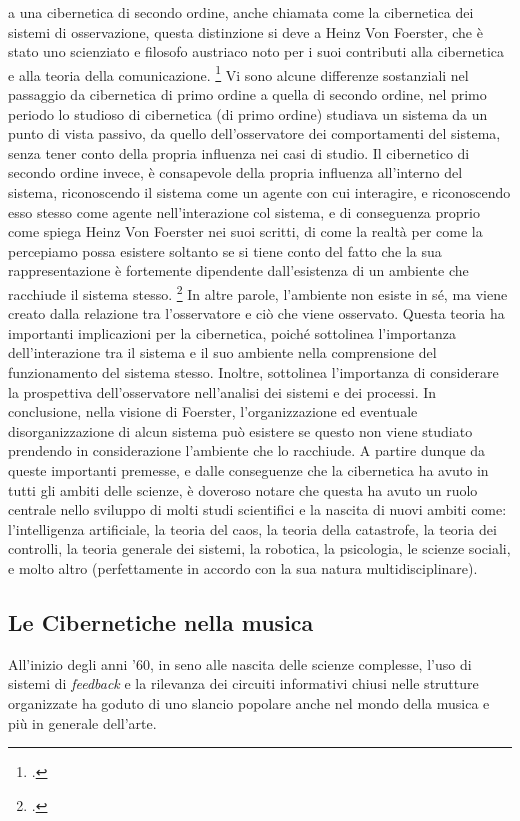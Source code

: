 a una cibernetica di secondo ordine, anche chiamata come la cibernetica dei sistemi di osservazione,
questa distinzione si deve a Heinz Von Foerster, 
che è stato uno scienziato e filosofo austriaco noto per i suoi contributi 
alla cibernetica e alla teoria della comunicazione. \footcite{scottsecondordercyb}
Vi sono alcune differenze sostanziali nel passaggio da cibernetica di primo ordine a quella di secondo ordine, 
nel primo periodo lo studioso di cibernetica (di primo ordine)
studiava un sistema da un punto di vista passivo, da quello dell'osservatore
dei comportamenti del sistema, senza tener conto della propria influenza 
nei casi di studio.
Il cibernetico di secondo ordine invece, è consapevole della propria 
influenza all'interno del sistema, riconoscendo il sistema come un agente con cui interagire, 
e riconoscendo esso stesso come agente nell'interazione col sistema, 
e di conseguenza proprio come spiega Heinz Von Foerster nei suoi scritti,
di come la realtà per come la percepiamo possa esistere
soltanto se si tiene conto del fatto che la sua rappresentazione è fortemente dipendente 
dall'esistenza di un ambiente che racchiude il sistema stesso. \footcite{understandingunderstanding}
In altre parole, l'ambiente non esiste in sé, ma viene creato dalla relazione 
tra l'osservatore e ciò che viene osservato.
Questa teoria ha importanti implicazioni per la cibernetica, 
poiché sottolinea l'importanza dell'interazione tra il sistema e il suo ambiente 
nella comprensione del funzionamento del sistema stesso. 
Inoltre, sottolinea l'importanza di considerare la prospettiva 
dell'osservatore nell'analisi dei sistemi e dei processi.
In conclusione, nella visione di Foerster, 
l'organizzazione ed eventuale disorganizzazione di alcun sistema può esistere 
se questo non viene studiato prendendo in considerazione l'ambiente che lo racchiude.
A partire dunque da queste importanti premesse, e dalle conseguenze 
che la cibernetica ha avuto in tutti gli ambiti delle scienze, è doveroso 
notare che questa ha avuto un ruolo centrale nello sviluppo di
molti studi scientifici e la nascita
di nuovi ambiti come: l'intelligenza artificiale, la teoria del caos,
la teoria della catastrofe,
la teoria dei controlli, la teoria generale dei sistemi, la robotica,
la psicologia, le scienze sociali, e molto altro 
(perfettamente in accordo con la sua natura multidisciplinare).

\subsection{Le Cibernetiche nella musica}
\label{sec:Le cibernetiche nella musica} 
All'inizio degli anni '60, in seno alle nascita delle scienze complesse,
l'uso di sistemi di \emph{feedback}  e la rilevanza dei circuiti informativi chiusi
nelle strutture organizzate
ha goduto di uno slancio popolare anche nel mondo della musica
e più in generale dell'arte. 

